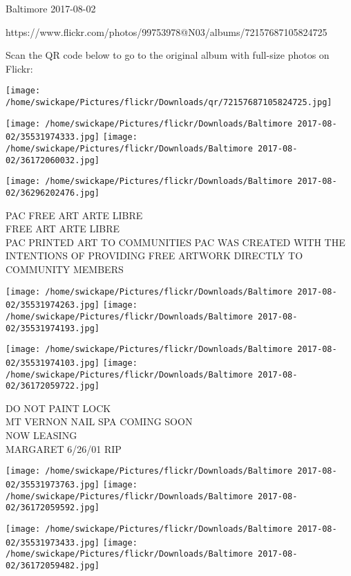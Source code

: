 \documentclass[10pt,letterpaper]{article}
\begin{document}
Baltimore 2017-08-02

https://www.flickr.com/photos/99753978@N03/albums/72157687105824725

Scan the QR code below to go to the original album with full-size photos on Flickr:

\texttt{[image: /home/swickape/Pictures/flickr/Downloads/qr/72157687105824725.jpg]}
\pagebreak

\texttt{[image: /home/swickape/Pictures/flickr/Downloads/Baltimore 2017-08-02/35531974333.jpg]}
\texttt{[image: /home/swickape/Pictures/flickr/Downloads/Baltimore 2017-08-02/36172060032.jpg]}

\vspace{0.25in}
\texttt{[image: /home/swickape/Pictures/flickr/Downloads/Baltimore 2017-08-02/36296202476.jpg]}

PAC FREE ART ARTE LIBRE\\
FREE ART ARTE LIBRE\\
PAC PRINTED ART TO COMMUNITIES PAC WAS CREATED WITH THE INTENTIONS OF PROVIDING FREE ARTWORK DIRECTLY TO COMMUNITY MEMBERS\\
\pagebreak

\texttt{[image: /home/swickape/Pictures/flickr/Downloads/Baltimore 2017-08-02/35531974263.jpg]}
\texttt{[image: /home/swickape/Pictures/flickr/Downloads/Baltimore 2017-08-02/35531974193.jpg]}

\texttt{[image: /home/swickape/Pictures/flickr/Downloads/Baltimore 2017-08-02/35531974103.jpg]}
\texttt{[image: /home/swickape/Pictures/flickr/Downloads/Baltimore 2017-08-02/36172059722.jpg]}

DO NOT PAINT LOCK\\
MT VERNON NAIL SPA COMING SOON\\
NOW LEASING\\
MARGARET 6/26/01 RIP\\
\pagebreak

\texttt{[image: /home/swickape/Pictures/flickr/Downloads/Baltimore 2017-08-02/35531973763.jpg]}
\texttt{[image: /home/swickape/Pictures/flickr/Downloads/Baltimore 2017-08-02/36172059592.jpg]}

\texttt{[image: /home/swickape/Pictures/flickr/Downloads/Baltimore 2017-08-02/35531973433.jpg]}
\texttt{[image: /home/swickape/Pictures/flickr/Downloads/Baltimore 2017-08-02/36172059482.jpg]}
\end{document}
